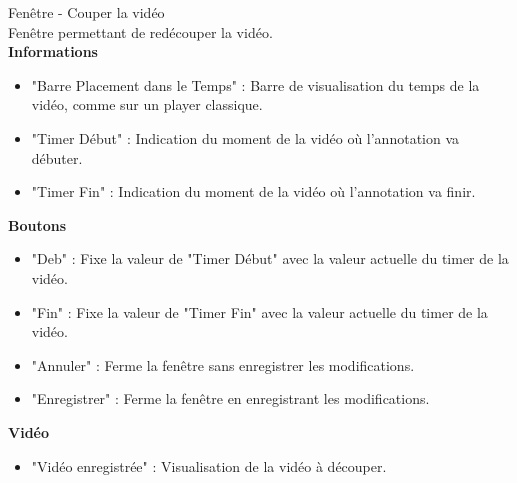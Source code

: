 \documentclass[11pt,french,a4paper]{report}
\begin{document}
\Large Fenêtre - Couper la vidéo\normalsize \\
    Fenêtre permettant de redécouper la vidéo. \\
\large \textbf{Informations}\normalsize
    \begin{itemize}[label=, leftmargin=*,parsep=0cm,itemsep=0cm,topsep=0cm]
        \item "Barre Placement dans le Temps" : Barre de visualisation du temps de la vidéo, comme sur un player classique.
        \item "Timer Début" : Indication du moment de la vidéo où l'annotation va débuter.
        \item "Timer Fin" : Indication du moment de la vidéo où l'annotation va finir.
    \end{itemize}
\large \textbf{Boutons}\normalsize
    \begin{itemize}[label=, leftmargin=*,parsep=0cm,itemsep=0cm,topsep=0cm]
        \item "Deb" : Fixe la valeur de "Timer Début" avec la valeur actuelle du timer de la vidéo.
        \item "Fin" : Fixe la valeur de "Timer Fin" avec la valeur actuelle du timer de la vidéo.
        \item "Annuler" : Ferme la fenêtre sans enregistrer les modifications.
        \item "Enregistrer" : Ferme la fenêtre en enregistrant les modifications.
    \end{itemize}
\large \textbf{Vidéo}\normalsize
    \begin{itemize}[label=, leftmargin=*,parsep=0cm,itemsep=0cm,topsep=0cm]
        \item "Vidéo enregistrée" : Visualisation de la vidéo à découper.
    \end{itemize}

\dotfill \\
\end{document}
